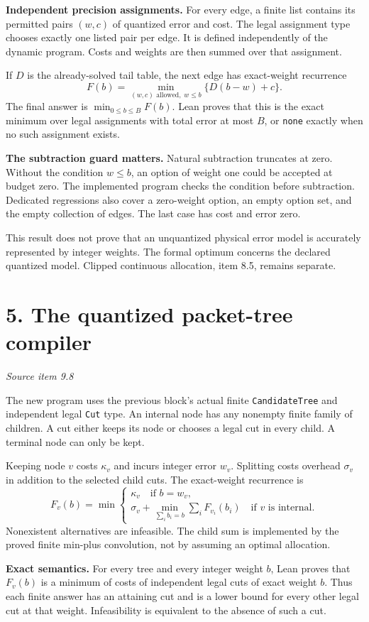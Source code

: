 \documentclass[11pt]{article}
\newcommand{\code}[1]{\texttt{\small #1}}
\newcommand{\pageheading}[2]{\section*{\color{ink}#1}\textit{#2}\par}
\begin{document}
\textbf{Independent precision assignments.} For every edge, a finite list contains its permitted pairs $(w,c)$ of quantized error and cost. The legal assignment type chooses exactly one listed pair per edge. It is defined independently of the dynamic program. Costs and weights are then summed over that assignment.

If $D$ is the already-solved tail table, the next edge has exact-weight recurrence
\[
F(b)=\min_{(w,c)\text{ allowed},\;w\leq b}\{D(b-w)+c\}.
\]
The final answer is $\min_{0\leq b\leq B}F(b)$. Lean proves that this is the exact minimum over legal assignments with total error at most $B$, or \code{none} exactly when no such assignment exists.

\textbf{The subtraction guard matters.} Natural subtraction truncates at zero. Without the condition $w\leq b$, an option of weight one could be accepted at budget zero. The implemented program checks the condition before subtraction. Dedicated regressions also cover a zero-weight option, an empty option set, and the empty collection of edges. The last case has cost and error zero.

This result does not prove that an unquantized physical error model is accurately represented by integer weights. The formal optimum concerns the declared quantized model. Clipped continuous allocation, item 8.5, remains separate.

\newpage
\pageheading{5. The quantized packet-tree compiler}{Source item 9.8}
The new program uses the previous block's actual finite \code{CandidateTree} and independent legal \code{Cut} type. An internal node has any nonempty finite family of children. A cut either keeps its node or chooses a legal cut in every child. A terminal node can only be kept.

Keeping node $v$ costs $\kappa_v$ and incurs integer error $w_v$. Splitting costs overhead $\sigma_v$ in addition to the selected child cuts. The exact-weight recurrence is
\[
F_v(b)=\min\left\{
\begin{array}{l}
\kappa_v\quad\text{if }b=w_v,\\[2pt]
\displaystyle\sigma_v+
\min_{\sum_i b_i=b}\sum_iF_{v_i}(b_i)\quad\text{if }v\text{ is internal}.
\end{array}\right.
\]
Nonexistent alternatives are infeasible. The child sum is implemented by the proved finite min-plus convolution, not by assuming an optimal allocation.

\textbf{Exact semantics.} For every tree and every integer weight $b$, Lean proves that $F_v(b)$ is a minimum of costs of independent legal cuts of exact weight $b$. Thus each finite answer has an attaining cut and is a lower bound for every other legal cut at that weight. Infeasibility is equivalent to the absence of such a cut.
\end{document}

